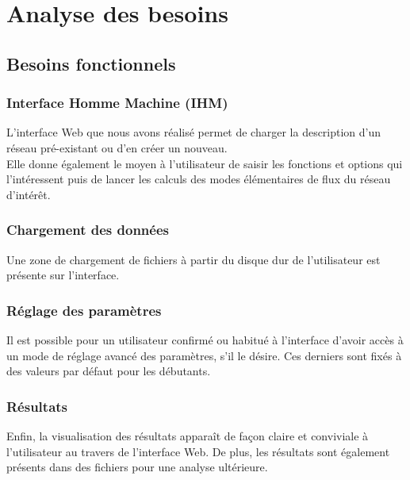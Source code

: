 \section{Analyse des besoins}

\subsection{Besoins fonctionnels}

\subsubsection{Interface Homme Machine (IHM)}
L'interface Web que nous avons réalisé permet de charger la description d'un réseau pré-existant ou d'en créer un nouveau.\\
Elle donne également le moyen à l'utilisateur de saisir les fonctions et options qui l'intéressent puis de lancer les calculs des modes élémentaires de flux du réseau d'intérêt. 

\subsubsection{Chargement des données}
Une zone de chargement de fichiers à partir du disque dur de l'utilisateur est présente sur l'interface. 

\subsubsection{Réglage des paramètres}
Il est possible pour un utilisateur confirmé ou habitué à l'interface d'avoir accès à un mode de réglage avancé des paramètres, s'il le désire. Ces derniers sont fixés à des valeurs par défaut pour les débutants. 

\subsubsection{Résultats}
Enfin, la visualisation des résultats apparaît de façon claire et conviviale à l'utilisateur au travers de l'interface Web. De plus, les résultats sont également présents dans des fichiers pour une analyse ultérieure. %

